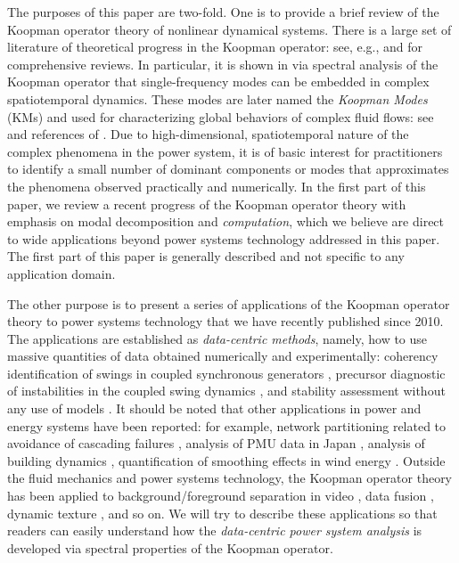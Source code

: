 \documentclass[a4paper,10pt]{article}
\begin{document}
%
The purposes of this paper are two-fold.  
One is to provide a brief review of the Koopman operator theory of nonlinear dynamical systems. 
There is a large set of literature of theoretical progress in the Koopman operator: see, e.g., \cite{Mezic_PD197,Mezic_ND41,Marko_PD241,Alex_CHAOS22,Mauroy_PD261,Lan_PD242,Alex_CDC13,Ryan_Preprint,Mezic_CDC15,Hassan_Preprint} and \cite{Marko_CHAOS22,Mezic_ARFM45} for comprehensive reviews.  
In particular, it is shown in \cite{Mezic_ND41} via spectral analysis of the Koopman operator that single-frequency modes can be embedded in complex spatiotemporal dynamics.  
These modes are later named the \emph{Koopman Modes} (KMs) \cite{Rowley_JFM641} and used for characterizing global behaviors of complex fluid flows: see \cite{Rowley_JFM641,Phan:2015} and references of \cite{Mezic_ARFM45}.  
Due to high-dimensional, spatiotemporal nature of the complex phenomena in the power system, it is of basic interest for practitioners to identify a small number of dominant components or modes that approximates the phenomena observed practically and numerically.  
In the first part of this paper, we review a recent progress of the Koopman operator theory with emphasis on modal decomposition and \emph{computation}, which we believe are direct to wide applications beyond power systems technology addressed in this paper.  
The first part of this paper is generally described and not specific to any application domain.  

%
The other purpose is to present a series of applications of the Koopman operator theory to power systems technology that we have recently published since 2010.  
The applications are established as \emph{data-centric methods}, namely, how to use massive quantities of data obtained numerically and experimentally:  coherency identification of swings in coupled synchronous generators \cite{Susuki_IEEETPWRS26}, precursor diagnostic of instabilities in the coupled swing dynamics \cite{Susuki_IEEETPWRS27}, and stability assessment without any use of models \cite{Susuki_IEEETPWRS29}.  
It should be noted that other applications in power and energy systems have been reported: for example, network partitioning related to avoidance of cascading failures \cite{Raak_IEEETPWRS2015,Raak_IFACCPES15}, analysis of PMU data in Japan \cite{Ota_IEEJ2015}, analysis of building dynamics \cite{Eisenhower_SimBuild2012,Georgescu_EB86}, quantification of smoothing effects in wind energy \cite{Raak_IEEJ2016}.  
Outside the fluid mechanics and power systems technology, the Koopman operator theory has been applied to background/foreground separation in video \cite{Grosek_Preprint}, data fusion \cite{Matt_EPL109}, dynamic texture \cite{Surana_ACC15}, and so on.  
We will try to describe these applications so that readers can easily understand how the \emph{data-centric power system analysis} is developed via spectral properties of the Koopman operator.  
\end{document}
